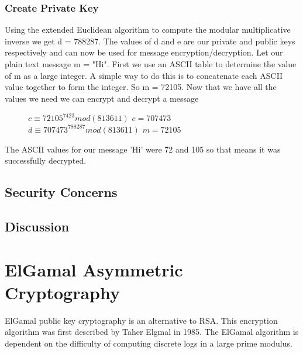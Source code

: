 \documentclass[conference]{IEEEtran}
\begin{document}
\subsubsection{Create Private Key} 
Using the extended Euclidean algorithm to compute the modular multiplicative inverse we get d = 788287. The values of d and e are our private and public keys respectively and can now be used for message encryption/decryption. \newline \indent
Let our plain text message m = "Hi". First we use an ASCII table to determine the value of m as a large integer. A simple way to do this is to concatenate each ASCII value together to form the integer. So m = 72105. Now that we have all the values we need we can encrypt and decrypt a message
\begin{figure}[h]
	\begin{center}
		$c \equiv {72105}^{7423} mod (813611)$ \newline
		$c = 707473$ \newline
		$d \equiv {707473}^{788287} mod (813611)$ \newline
		$m = 72105$ \newline
	\end{center}
\end{figure}

The ASCII values for our message 'Hi' were 72 and 105 so that means it was successfully decrypted. 


\color{red}
\subsection{Security Concerns}

\subsection{Discussion}


\color{black}


\section{ElGamal Asymmetric Cryptography}
ElGamal public key cryptography is an alternative to RSA. This encryption algorithm was first described by Taher Elgmal in 1985. The ElGamal algorithm is dependent on the difficulty of computing discrete logs in a large prime modulus.
\end{document}
